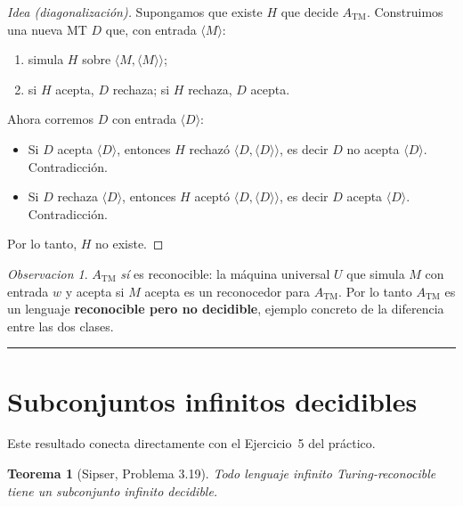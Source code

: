 \documentclass[11pt,a4paper]{article}
\theoremstyle{plain}
\newtheorem{teorema}{Teorema}[section]
\theoremstyle{definition}
\theoremstyle{remark}
\newtheorem*{observacion}{Observacion}
\newcommand{\TM}{\mathrm{TM}}
\newcommand{\enc}[1]{\langle #1\rangle}
\newcommand{\ATM}{A_{\TM}}
\begin{document}
\begin{proof}[Idea (diagonalizaci\'on)]
Supongamos que existe $H$ que decide $\ATM$. Construimos una nueva MT $D$
que, con entrada $\enc{M}$:
\begin{enumerate}
  \item simula $H$ sobre $\enc{M,\enc{M}}$;
  \item si $H$ acepta, $D$ rechaza; si $H$ rechaza, $D$ acepta.
\end{enumerate}
Ahora corremos $D$ con entrada $\enc{D}$:
\begin{itemize}
  \item Si $D$ acepta $\enc{D}$, entonces $H$ rechaz\'o $\enc{D,\enc{D}}$,
        es decir $D$ no acepta $\enc{D}$. Contradicci\'on.
  \item Si $D$ rechaza $\enc{D}$, entonces $H$ acept\'o $\enc{D,\enc{D}}$,
        es decir $D$ acepta $\enc{D}$. Contradicci\'on.
\end{itemize}
Por lo tanto, $H$ no existe.
\end{proof}

\begin{observacion}
$\ATM$ \emph{s\'i} es reconocible: la m\'aquina universal $U$ que simula
$M$ con entrada $w$ y acepta si $M$ acepta es un reconocedor para $\ATM$.
Por lo tanto $\ATM$ es un lenguaje \textbf{reconocible pero no decidible},
ejemplo concreto de la diferencia entre las dos clases.
\end{observacion}

\bigskip\hrule\bigskip

\section{Subconjuntos infinitos decidibles}
\label{sec:subconjunto}

Este resultado conecta directamente con el Ejercicio~5 del pr\'actico.

\begin{teorema}[Sipser, Problema 3.19]
\label{teo:sub-decidible}
Todo lenguaje infinito Turing-reconocible tiene un subconjunto infinito
decidible.
\end{teorema}
\end{document}
